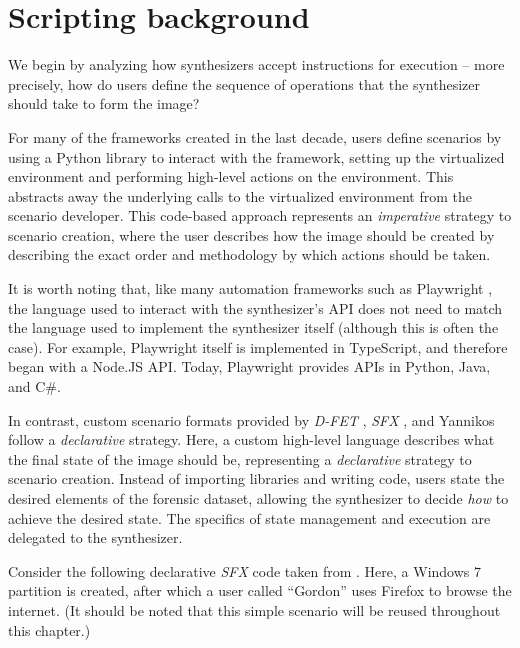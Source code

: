 \section{Scripting background}\label{scripting-background}

We begin by analyzing how synthesizers accept instructions for execution
-- more precisely, how do users define the sequence of operations that
the synthesizer should take to form the image?

For many of the frameworks created in the last decade, users define
scenarios by using a Python library to interact with the framework,
setting up the virtualized environment and performing high-level actions
on the environment. This abstracts away the underlying calls to the
virtualized environment from the scenario developer. This code-based
approach represents an \emph{imperative} strategy to scenario creation,
where the user describes how the image should be created by describing
the exact order and methodology by which actions should be taken.

It is worth noting that, like many automation frameworks such as
Playwright \cite{MicrosoftPlaywrightpython2025}, the language used
to interact with the synthesizer's API does not need to match the
language used to implement the synthesizer itself (although this is
often the case). For example, Playwright itself is implemented in
TypeScript, and therefore began with a Node.JS API. Today, Playwright
provides APIs in Python, Java, and C\#.

In contrast, custom scenario formats provided by \emph{D-FET}
\cite{williamCloudbasedDigitalForensics2011}, \emph{SFX}
\cite{russellForensicImageDescription2012}, and Yannikos
\cite{yannikosDataCorporaDigital2014} follow a \emph{declarative}
strategy. Here, a custom high-level language describes what the final
state of the image should be, representing a \emph{declarative} strategy
to scenario creation. Instead of importing libraries and writing code,
users state the desired elements of the forensic dataset, allowing the
synthesizer to decide \emph{how} to achieve the desired state. The
specifics of state management and execution are delegated to the
synthesizer.

Consider the following declarative \emph{SFX} code taken from
\cite{russellForensicImageDescription2012}. Here, a Windows 7
partition is created, after which a user called ``Gordon'' uses Firefox
to browse the internet. (It should be noted that this simple scenario
will be reused throughout this chapter.)

